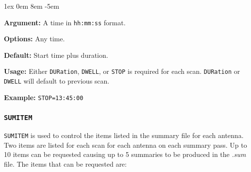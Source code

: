\documentclass{report}
\newcommand{\rcwbox}[5]{
  \begin{list}{}{\parsep 1ex  \itemsep 0em
                 \leftmargin 8em  \itemindent -5em }
    \item {\bf Argument:} #1
    \item {\bf Options:}  #2
    \item {\bf Default:}  #3
    \item {\bf Usage:}    #4
    \item {\bf Example:}  #5
  \end{list}
}
\begin{document}
\rcwbox
{A time in {\tt hh:mm:ss} format.}
{Any time.}
{Start time plus duration.}
{Either {\tt DURation}, {\tt DWELL}, or {\tt STOP} is required for
each scan. {\tt DURation} or {\tt DWELL} will default to previous scan.}
{{\tt STOP=13:45:00}}

\subsubsection{\label{MP:SUMITEM}{\tt SUMITEM}}

{\tt SUMITEM} is used to control the items listed in the summary file
for each antenna.  Two items are listed for each scan for each antenna
on each summary pass.  Up to 10 items can be requested causing
up to 5 summaries to be produced in the {\sl .sum} file.  The items
that can be requested are:
\end{document}
